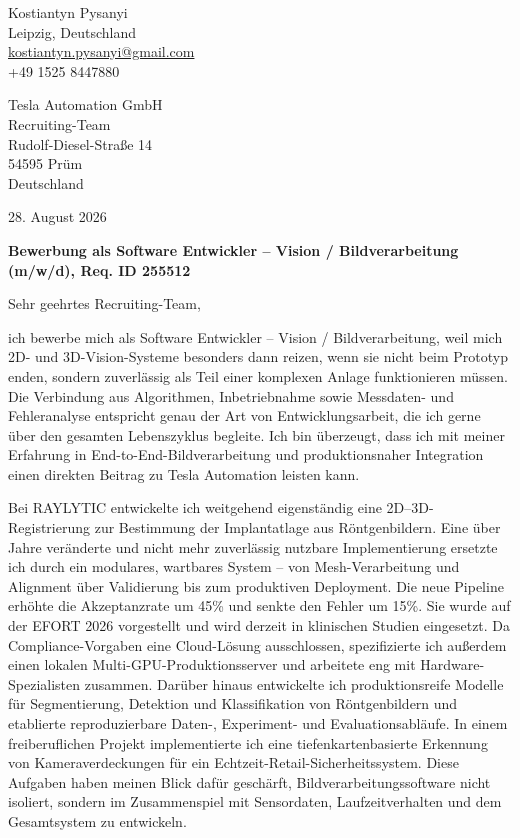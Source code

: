 \documentclass[11pt,a4paper]{article}
\begin{document}
\begin{flushright}
Kostiantyn Pysanyi\\
Leipzig, Deutschland\\
\href{mailto:kostiantyn.pysanyi@gmail.com}{kostiantyn.pysanyi@gmail.com}\\
+49 1525 8447880
\end{flushright}

Tesla Automation GmbH\\
Recruiting-Team\\
Rudolf-Diesel-Straße 14\\
54595 Prüm\\
Deutschland

\begin{flushright}
28. August 2026
\end{flushright}

\textbf{Bewerbung als Software Entwickler -- Vision / Bildverarbeitung (m/w/d), Req. ID 255512}

Sehr geehrtes Recruiting-Team,

ich bewerbe mich als Software Entwickler -- Vision / Bildverarbeitung, weil mich 2D- und 3D-Vision-Systeme besonders dann reizen, wenn sie nicht beim Prototyp enden, sondern zuverlässig als Teil einer komplexen Anlage funktionieren müssen. Die Verbindung aus Algorithmen, Inbetriebnahme sowie Messdaten- und Fehleranalyse entspricht genau der Art von Entwicklungsarbeit, die ich gerne über den gesamten Lebenszyklus begleite. Ich bin überzeugt, dass ich mit meiner Erfahrung in End-to-End-Bildverarbeitung und produktionsnaher Integration einen direkten Beitrag zu Tesla Automation leisten kann.

Bei RAYLYTIC entwickelte ich weitgehend eigenständig eine 2D--3D-Registrierung zur Bestimmung der Implantatlage aus Röntgenbildern. Eine über Jahre veränderte und nicht mehr zuverlässig nutzbare Implementierung ersetzte ich durch ein modulares, wartbares System -- von Mesh-Verarbeitung und Alignment über Validierung bis zum produktiven Deployment. Die neue Pipeline erhöhte die Akzeptanzrate um 45\% und senkte den Fehler um 15\%. Sie wurde auf der EFORT 2026 vorgestellt und wird derzeit in klinischen Studien eingesetzt. Da Compliance-Vorgaben eine Cloud-Lösung ausschlossen, spezifizierte ich außerdem einen lokalen Multi-GPU-Produktionsserver und arbeitete eng mit Hardware-Spezialisten zusammen.
Darüber hinaus entwickelte ich produktionsreife Modelle für Segmentierung, Detektion und Klassifikation von Röntgenbildern und etablierte reproduzierbare Daten-, Experiment- und Evaluationsabläufe. In einem freiberuflichen Projekt implementierte ich eine tiefenkartenbasierte Erkennung von Kameraverdeckungen für ein Echtzeit-Retail-Sicherheitssystem. Diese Aufgaben haben meinen Blick dafür geschärft, Bildverarbeitungssoftware nicht isoliert, sondern im Zusammenspiel mit Sensordaten, Laufzeitverhalten und dem Gesamtsystem zu entwickeln.
\end{document}
